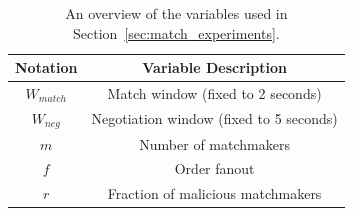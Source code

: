 



%

\begin{table}[t!]
	\centering
	\begin{tabular}{|c|c|}
		\hline
		\textbf{Notation} & \textbf{Variable Description} \\ \hline
		$ W_{match} $ & Match window (fixed to 2 seconds) \\ \hline
		$ W_{neg} $ & Negotiation window (fixed to 5 seconds) \\ \hline
		$ m $ & Number of matchmakers \\ \hline
		$ f $ & Order fanout \\ \hline
		$ r $ & Fraction of malicious matchmakers \\ \hline
	\end{tabular}
	\caption{An overview of the variables used in Section~\ref{sec:match_experiments}.}
	\label{table:experiment_parameters}
\end{table}


